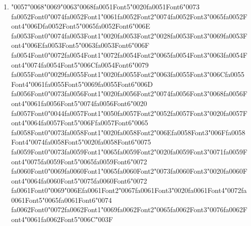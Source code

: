 \documentclass[12pt]{article}
\begin{document}
\begin{enumerate}[label=Q\arabic*.]
\item {\char"0057}{\char"0068}{\char"0069}{\char"0063}{\char"0068}{\csname fa0051Font5\endcsname\char"0020}{\csname fa0051Font6\endcsname\char"0073} {\csname fa0052Font0\endcsname\char"0074}{\csname fa0052Font1\endcsname\char"0061}{\csname fa0052Font2\endcsname\char"0074}{\csname fa0052Font3\endcsname\char"0065}{\csname fa0052Font4\endcsname\char"006D}{\csname fa0052Font5\endcsname\char"0065}{\csname fa0052Font6\endcsname\char"006E} {\csname fa0053Font0\endcsname\char"0074}{\csname fa0053Font1\endcsname\char"0020}{\csname fa0053Font2\endcsname\char"0028}{\csname fa0053Font3\endcsname\char"0069}{\csname fa0053Font4\endcsname\char"006E}{\csname fa0053Font5\endcsname\char"0063}{\csname fa0053Font6\endcsname\char"006F} {\csname fa0054Font0\endcsname\char"0072}{\csname fa0054Font1\endcsname\char"0072}{\csname fa0054Font2\endcsname\char"0065}{\csname fa0054Font3\endcsname\char"0063}{\csname fa0054Font4\endcsname\char"0074}{\csname fa0054Font5\endcsname\char"006C}{\csname fa0054Font6\endcsname\char"0079} {\csname fa0055Font0\endcsname\char"0029}{\csname fa0055Font1\endcsname\char"0020}{\csname fa0055Font2\endcsname\char"0063}{\csname fa0055Font3\endcsname\char"006C}{\csname fa0055Font4\endcsname\char"0061}{\csname fa0055Font5\endcsname\char"0069}{\csname fa0055Font6\endcsname\char"006D} {\csname fa0056Font0\endcsname\char"0073}{\csname fa0056Font1\endcsname\char"0020}{\csname fa0056Font2\endcsname\char"0074}{\csname fa0056Font3\endcsname\char"0068}{\csname fa0056Font4\endcsname\char"0061}{\csname fa0056Font5\endcsname\char"0074}{\csname fa0056Font6\endcsname\char"0020} {\csname fa0057Font0\endcsname\char"0044}{\csname fa0057Font1\endcsname\char"0050}{\csname fa0057Font2\endcsname\char"0052}{\csname fa0057Font3\endcsname\char"0020}{\csname fa0057Font4\endcsname\char"0064}{\csname fa0057Font5\endcsname\char"006F}{\csname fa0057Font6\endcsname\char"0065} {\csname fa0058Font0\endcsname\char"0073}{\csname fa0058Font1\endcsname\char"0020}{\csname fa0058Font2\endcsname\char"006E}{\csname fa0058Font3\endcsname\char"006F}{\csname fa0058Font4\endcsname\char"0074}{\csname fa0058Font5\endcsname\char"0020}{\csname fa0058Font6\endcsname\char"0075} {\csname fa0059Font0\endcsname\char"0073}{\csname fa0059Font1\endcsname\char"0065}{\csname fa0059Font2\endcsname\char"0020}{\csname fa0059Font3\endcsname\char"0071}{\csname fa0059Font4\endcsname\char"0075}{\csname fa0059Font5\endcsname\char"0065}{\csname fa0059Font6\endcsname\char"0072} {\csname fa0060Font0\endcsname\char"0069}{\csname fa0060Font1\endcsname\char"0065}{\csname fa0060Font2\endcsname\char"0073}{\csname fa0060Font3\endcsname\char"0020}{\csname fa0060Font4\endcsname\char"0064}{\csname fa0060Font5\endcsname\char"0075}{\csname fa0060Font6\endcsname\char"0072} {\csname fa0061Font0\endcsname\char"0069}{\char"006E}{\csname fa0061Font2\endcsname\char"0067}{\csname fa0061Font3\endcsname\char"0020}{\csname fa0061Font4\endcsname\char"0072}{\csname fa0061Font5\endcsname\char"0065}{\csname fa0061Font6\endcsname\char"0074} {\csname fa0062Font0\endcsname\char"0072}{\csname fa0062Font1\endcsname\char"0069}{\csname fa0062Font2\endcsname\char"0065}{\csname fa0062Font3\endcsname\char"0076}{\csname fa0062Font4\endcsname\char"0061}{\csname fa0062Font5\endcsname\char"006C}{\char"003F}

\end{enumerate}
\end{document}
